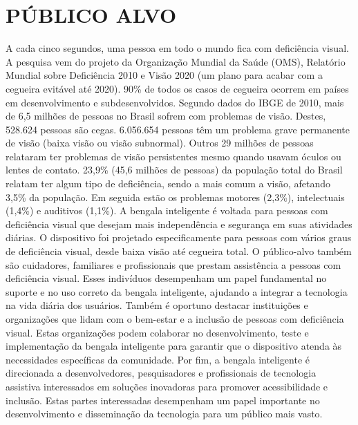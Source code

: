 \section{PÚBLICO ALVO}
A cada cinco segundos, uma pessoa em todo o mundo fica com deficiência visual. A pesquisa vem do projeto da Organização Mundial da Saúde (OMS), Relatório Mundial sobre Deficiência 2010 e Visão 2020 (um plano para acabar com a cegueira evitável até 2020). 90\% de todos os casos de cegueira ocorrem em países em desenvolvimento e subdesenvolvidos. Segundo dados do IBGE de 2010, mais de 6,5 milhões de pessoas no Brasil sofrem com problemas de visão.
Destes, 528.624 pessoas são cegas. 6.056.654 pessoas têm um problema grave permanente de visão (baixa visão ou visão subnormal). Outros 29 milhões de pessoas relataram ter problemas de visão persistentes mesmo quando usavam óculos ou lentes de contato.
23,9\% (45,6 milhões de pessoas) da população total do Brasil relatam ter algum tipo de deficiência, sendo a mais comum a visão, afetando 3,5\% da população. Em seguida estão os problemas motores (2,3\%), intelectuais (1,4\%) e auditivos (1,1\%).
A bengala inteligente é voltada para pessoas com deficiência visual que desejam mais independência e segurança em suas atividades diárias. O dispositivo foi projetado especificamente para pessoas com vários graus de deficiência visual, desde baixa visão até cegueira total.
O público-alvo também são cuidadores, familiares e profissionais que prestam assistência a pessoas com deficiência visual. Esses indivíduos desempenham um papel fundamental no suporte e no uso correto da bengala inteligente, ajudando a integrar a tecnologia na vida diária dos usuários.
Também é oportuno destacar instituições e organizações que lidam com o bem-estar e a inclusão de pessoas com deficiência visual. Estas organizações podem colaborar no desenvolvimento, teste e implementação da bengala inteligente para garantir que o dispositivo atenda às necessidades específicas da comunidade.
Por fim, a bengala inteligente é direcionada a desenvolvedores, pesquisadores e profissionais de tecnologia assistiva interessados em soluções inovadoras para promover acessibilidade e inclusão. Estas partes interessadas desempenham um papel importante no desenvolvimento e disseminação da tecnologia para um público mais vasto.

